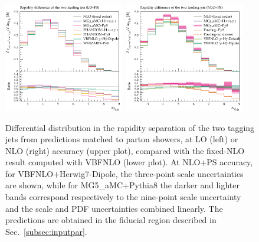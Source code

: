 \documentclass[twocolumn,epjc3]{svjour3} %
\newlength{\width}
\begin{document}
\begin{figure}[hbt]
\centering
\includegraphics[width=0.47\textwidth]{figures/LOPS/Deltay_jj.pdf}
\includegraphics[width=0.47\textwidth]{figures/NLOPS/Deltay_jj.pdf}
\caption{Differential distribution in the
rapidity separation of the two tagging jets
from predictions matched to parton showers, at LO (left) or NLO (right) accuracy (upper plot), compared with the fixed-NLO result computed with {\sc VBFNLO} (lower plot). At NLO+PS accuracy, for
    {\sc VBFNLO}+{\sc Herwig7-Dipole}, the three-point scale uncertainties are shown, while for {\sc MG5\_aMC}+{\sc Pythia8} the darker and lighter bands correspond
    respectively to the nine-point scale uncertainty and the scale and PDF uncertainties combined linearly.
    The predictions are obtained in the fiducial region described in Sec.~\protect\ref{subsec:inputpar}.}
\label{fig:PSdyjj}
\end{figure}
\end{document}
